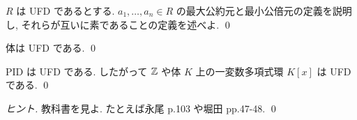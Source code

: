 \documentclass[12pt,twoside]{jarticle}
\begin{document}
\begin{question}[簡単]
 $R$ は UFD であるとする.
 $a_1,\ldots,a_n\in R$ の最大公約元と最小公倍元の定義を説明し, 
 それらが互いに素であることの定義を述べよ.
 \qed
\end{question}

\begin{question}
 体は UFD である.
 \qed
\end{question}

\begin{question}
 PID は UFD である. 
 したがって ${\mathbb Z}$ や体 $K$ 上の一変数多項式環 $K[x]$ は UFD である.
 \qed
\end{question}

\begin{proof}[ヒント]
 教科書を見よ.
 たとえば永尾 \cite{nagao-1983} p.103 や堀田 \cite{hotta-1987} pp.47-48. 
 \qed
\end{proof}
\end{document}
